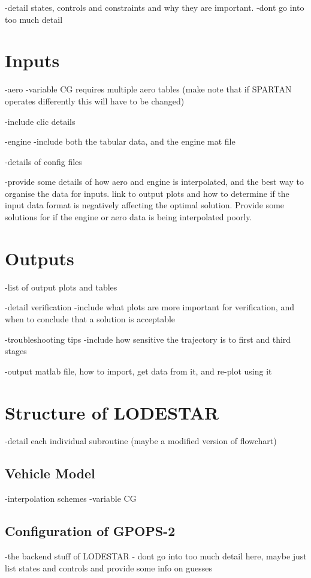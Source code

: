 \documentclass[a4paper,11pt]{book}
\begin{document}
-detail states, controls and constraints and why they are important.
-dont go into too much detail










\chapter{Inputs}
-aero
 -variable CG requires multiple aero tables (make note that if SPARTAN operates differently this will have to be changed)
 
 -include clic details
 

-engine
 -include both the tabular data, and the engine mat file 

-details of config files

-provide some details of how aero and engine is interpolated, and the best way to organise the data for inputs. link to output plots and how to determine if the input data format is negatively affecting the optimal solution. Provide some solutions for if the engine or aero data is being interpolated poorly. 

\chapter{Outputs}

-list of output plots and tables

-detail verification 
 -include what plots are more important for verification, and when to conclude that a solution is acceptable
 
-troubleshooting tips
 -include how sensitive the trajectory is to first and third stages


-output matlab file, how to import, get data from it, and re-plot using it

\chapter{Structure of LODESTAR}
-detail each individual subroutine (maybe a modified version of flowchart)

\section{Vehicle Model}
-interpolation schemes
-variable CG


\section{Configuration of GPOPS-2}
-the backend stuff of LODESTAR
- dont go into too much detail here, maybe just list states and controls and provide some info on guesses 
\end{document}
